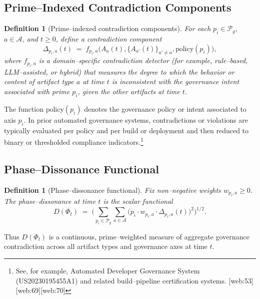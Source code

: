 \documentclass[11pt]{article}
\newtheorem{definition}[theorem]{Definition}
\begin{document}
\subsection{Prime--Indexed Contradiction Components}

\begin{definition}[Prime--indexed contradiction components]\label{def:Delta}
For each $p_i \in \mathcal{P}_g$, $a \in \mathcal{A}$, and $t \ge 0$, define a contradiction component
\[
  \Delta_{p_i,a}(t)
  \;=\;
  f_{p_i,a}\big(A_a(t), \{A_{a'}(t)\}_{a' \neq a}, \mathrm{policy}(p_i)\big),
\]
where $f_{p_i,a}$ is a domain--specific contradiction detector (for example, rule--based, LLM--assisted, or hybrid) that measures the degree to which the behavior or content of artifact type $a$ at time $t$ is inconsistent with the governance intent associated with prime $p_i$, given the other artifacts at time $t$.
\end{definition}

The function $\mathrm{policy}(p_i)$ denotes the governance policy or intent associated to axis $p_i$. In prior automated governance systems, contradictions or violations are typically evaluated per policy and per build or deployment and then reduced to binary or thresholded compliance indicators.\footnote{See, for example, Automated Developer Governance System (US20230195455A1) and related build--pipeline certification systems. [web:53][web:69][web:70]}

\subsection{Phase--Dissonance Functional}

\begin{definition}[Phase--dissonance functional]\label{def:D}
Fix non--negative weights $w_{p_i,a} \ge 0$. The phase--dissonance at time $t$ is the scalar functional
\begin{equation}\label{eq:D}
  D(\Phi_t)
  \;=\;
  \Bigg(
    \sum_{p_i \in \mathcal{P}_g} \sum_{a \in \mathcal{A}}
      \big( p_i \cdot w_{p_i,a} \cdot \Delta_{p_i,a}(t) \big)^2
  \Bigg)^{1/2}.
\end{equation}
\end{definition}

Thus $D(\Phi_t)$ is a continuous, prime--weighted measure of aggregate governance contradiction across all artifact types and governance axes at time $t$.
\end{document}

